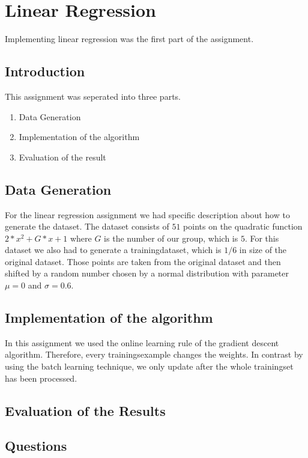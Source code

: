 \section{Linear Regression}

Implementing linear regression was the first part of the assignment.

\subsection{Introduction}

This assignment was seperated into three parts.
\begin{enumerate}
	\item Data Generation
	\item Implementation of the algorithm
	\item Evaluation of the result
\end{enumerate}

\subsection{Data Generation}

For the linear regression assignment we had specific description about how to generate the dataset. The dataset consists of $51$ points on the quadratic function $2*x^2 + G*x + 1$ where $G$ is the number of our group, which is $5$. For this dataset we also had to generate a trainingdataset, which is $1/6$ in size of the original dataset. Those points are taken from the original dataset and then shifted by a random number chosen by a normal distribution with parameter $\mu = 0$ and $\sigma = 0.6$.

\subsection{Implementation of the algorithm}

In this assignment we used the online learning rule of the gradient descent algorithm. Therefore, every trainingsexample changes the weights. In contrast by using the batch learning technique, we only update after the whole trainingset has been processed. 

\subsection{Evaluation of the Results} 


\subsection{Questions}

